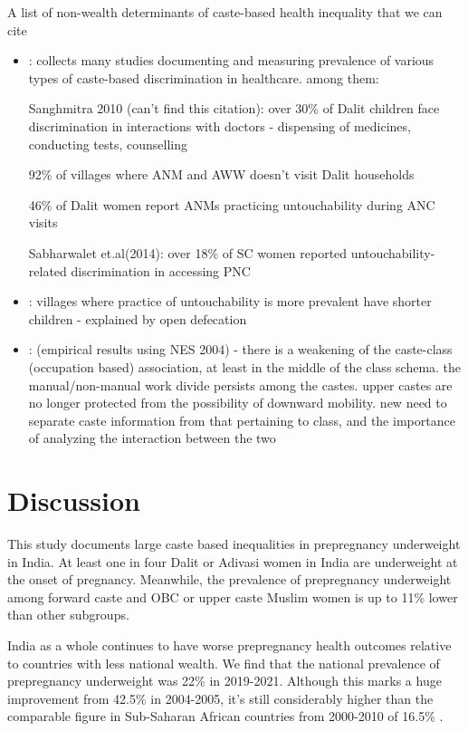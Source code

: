 A list of non-wealth determinants of caste-based health inequality that we can cite
\begin{itemize}
    \item \cite{diwakar2015caste}: collects many studies documenting and measuring prevalence of various types of caste-based discrimination in healthcare. among them: 

    Sanghmitra 2010 (can't find this citation): over 30\% of Dalit children face discrimination in interactions with doctors - dispensing of medicines, conducting tests, counselling

    92\% of villages where ANM and AWW doesn't visit Dalit households

    46\% of Dalit women report ANMs practicing untouchability during ANC visits

    
    Sabharwalet et.al(2014): over 18\% of SC women reported untouchability-related discrimination in accessing PNC

    \item \cite{lopalo2019consequences}: villages where practice of untouchability is more prevalent have shorter children - explained by open defecation

    \item \cite{vaid2012caste}: (empirical results using NES 2004) - there is a weakening of
    the caste-class (occupation based) association, at least in the middle of the class schema. the manual/non-manual work divide persists among the castes. upper castes are no longer protected from the possibility of downward mobility. new need to separate caste information from that pertaining to class, and the importance of analyzing the interaction between the two
    
\end{itemize}


\section{Discussion}

This study documents large caste based inequalities in prepregnancy underweight in India. At least one in four Dalit or Adivasi women in India are underweight at the onset of pregnancy. Meanwhile, the prevalence of prepregnancy underweight among forward caste and OBC or upper caste Muslim women is up to 11\% lower than other subgroups. 

India as a whole continues to have worse prepregnancy health outcomes relative to countries with less national wealth. We find that the national prevalence of prepregnancy underweight was 22\% in 2019-2021. Although this marks a huge improvement from 42.5\% in 2004-2005, it's still considerably higher than the comparable figure in Sub-Saharan African countries from 2000-2010 of 16.5\% .

